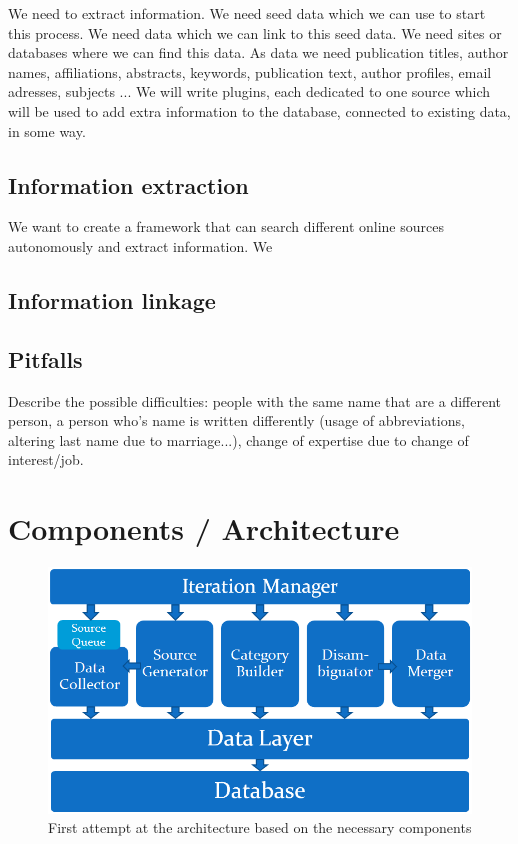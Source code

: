 We need to extract information. We need seed data which we can use to start this process. We need data which we can link to this seed data. We need sites or databases where we can find this data. As data we need publication titles, author names, affiliations, abstracts, keywords, publication text, author profiles, email adresses, subjects ... We will write plugins, each dedicated to one source which will be used to add extra information to the database, connected to existing data, in some way.



\subsection{Information extraction}

We want to create a framework that can search different online sources autonomously and extract information. We 


\subsection{Information linkage}



\subsection{Pitfalls}

Describe the possible difficulties: people with the same name that are a different person, a person who's name is written differently (usage of abbreviations, altering last name due to marriage...), change of expertise due to change of interest/job.

\section{Components / Architecture}

\begin{figure}[htbp]
	\centering
		\includegraphics[width=1.00\textwidth]{fig/architectuur.png}
	\caption{First attempt at the architecture based on the necessary components}
	\label{fig:architectuur}
\end{figure}


